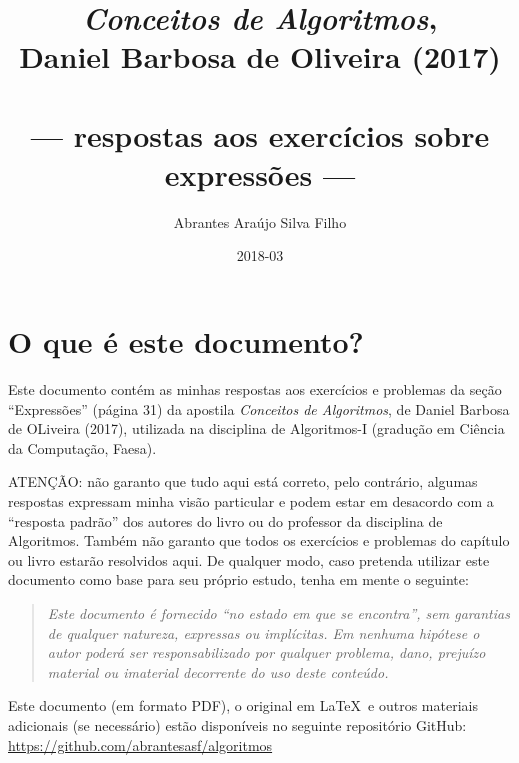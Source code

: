 \documentclass[pdftex,a4paper,12pt,brazil]{article} %
\begin{document}
\title{\emph{Conceitos de Algoritmos},\\
  Daniel Barbosa de Oliveira (2017)\\
  \ \\
--- respostas aos exercícios sobre expressões ---}
\author{Abrantes Araújo Silva Filho}
\date{2018-03}
\maketitle
\tableofcontents


\section{O que é este documento?} 
\label{o_que_e}

Este documento contém as minhas respostas aos exercícios e problemas da seção ``Expressões''
(página 31) da apostila \emph{Conceitos de Algoritmos}, de Daniel Barbosa de OLiveira (2017),
utilizada na disciplina de Algoritmos-I (gradução em Ciência da Computação, Faesa).

ATENÇÃO: não garanto que tudo aqui está correto, pelo contrário, algumas respostas expressam
minha visão particular e podem estar em desacordo com
a ``resposta padrão'' dos autores do livro ou do professor da disciplina de Algoritmos. Também
não garanto que todos os exercícios e problemas do capítulo ou livro estarão resolvidos aqui.
De qualquer modo, caso pretenda
utilizar este documento como base para seu próprio estudo, tenha em mente o seguinte:

\begin{quote}
  \emph{Este documento é fornecido ``no estado em que se encontra'', sem garantias de qualquer
    natureza, expressas ou implícitas. Em nenhuma hipótese o autor poderá ser responsabilizado
    por qualquer problema, dano, prejuízo material ou imaterial decorrente do uso deste
    conteúdo.}
\end{quote}

Este documento (em formato PDF), o original em \LaTeX\ e outros materiais
adicionais (se necessário) estão disponíveis no seguinte
repositório GitHub: \url{https://github.com/abrantesasf/algoritmos}
\end{document}

